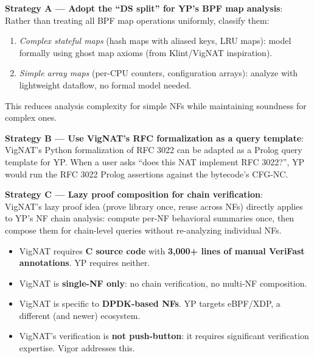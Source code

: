 \begin{strategybox}
\textbf{Strategy A --- Adopt the ``DS split'' for YP's BPF map analysis}:\\
Rather than treating all BPF map operations uniformly, classify them:
\begin{enumerate}
  \item \emph{Complex stateful maps} (hash maps with aliased keys, LRU maps): model formally using ghost map axioms (from Klint/VigNAT inspiration).
  \item \emph{Simple array maps} (per-CPU counters, configuration arrays): analyze with lightweight dataflow, no formal model needed.
\end{enumerate}
This reduces analysis complexity for simple NFs while maintaining soundness for complex ones.

\textbf{Strategy B --- Use VigNAT's RFC formalization as a query template}:\\
VigNAT's Python formalization of RFC 3022 can be adapted as a Prolog query template for YP. When a user asks ``does this NAT implement RFC 3022?'', YP would run the RFC 3022 Prolog assertions against the bytecode's CFG-NC.

\textbf{Strategy C --- Lazy proof composition for chain verification}:\\
VigNAT's lazy proof idea (prove library once, reuse across NFs) directly applies to YP's NF chain analysis: compute per-NF behavioral summaries once, then compose them for chain-level queries without re-analyzing individual NFs.
\end{strategybox}

\begin{limitbox}
\begin{itemize}
  \item VigNAT requires \textbf{C source code} with \textbf{3,000+ lines of manual VeriFast annotations}. YP requires neither.
  \item VigNAT is \textbf{single-NF only}: no chain verification, no multi-NF composition.
  \item VigNAT is specific to \textbf{DPDK-based NFs}. YP targets eBPF/XDP, a different (and newer) ecosystem.
  \item VigNAT's verification is \textbf{not push-button}: it requires significant verification expertise. Vigor addresses this.
\end{itemize}
\end{limitbox}

